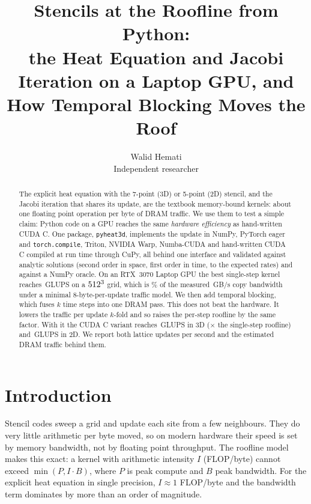 \documentclass[11pt]{article}
\title{Stencils at the Roofline from Python:\\ the Heat Equation and Jacobi Iteration on a
Laptop GPU, and How Temporal Blocking Moves the Roof}
\author{Walid Hemati\\ \small Independent researcher}
\date{}
\newif\ifprovisional
\newcommand{\GLUPS}{\,GLUPS}
\newcommand{\code}[1]{\texttt{#1}}
\begin{document}
\maketitle

\ifprovisional
\begin{center}
\fcolorbox{red!70!black}{red!8}{\parbox{0.92\linewidth}{\centering\bfseries\color{red!60!black}
PROVISIONAL NUMBERS. The performance figures in this version come from
\texttt{results/\benchSource}, measured during development on a GPU shared with other jobs.
They will be replaced by the serial, idle-GPU run of \texttt{bench/run.py --full}.}}
\end{center}
\fi

\begin{abstract}
The explicit heat equation with the 7-point (3D) or 5-point (2D) stencil, and the Jacobi
iteration that shares its update, are the textbook memory-bound kernels: about one floating
point operation per byte of DRAM traffic. We use them to test a simple claim: Python code on a
GPU reaches the same \emph{hardware efficiency} as hand-written CUDA C. One package,
\code{pyheat3d}, implements the update in NumPy, PyTorch eager and \code{torch.compile},
Triton, NVIDIA Warp, Numba-CUDA and hand-written CUDA C compiled at run time through CuPy, all
behind one interface and validated against analytic solutions (second order in space, first
order in time, to the expected rates) and against a NumPy oracle. On an RTX~3070 Laptop GPU the
best single-step kernel reaches \bestSingleThreeDGLUPS\GLUPS{} on a $512^3$ grid, which is
\bestSingleThreeDPctCopy\% of the measured \copyBW\,GB/s copy bandwidth under a minimal
8-byte-per-update traffic model. We then add temporal blocking, which fuses $k$ time steps
into one DRAM pass. This does not beat the hardware. It lowers the traffic per update $k$-fold
and so raises the per-step roofline by the same factor. With it the CUDA C variant reaches
\bestTBThreeDGLUPS\GLUPS{} in 3D (\bestTBThreeDOverRoof$\times$ the single-step roofline) and
\bestTBTwoDGLUPS\GLUPS{} in 2D. We report both lattice updates per second and the estimated DRAM
traffic behind them.
\end{abstract}

\section{Introduction}
Stencil codes sweep a grid and update each site from a few neighbours. They do very little
arithmetic per byte moved, so on modern hardware their speed is set by memory bandwidth, not by
floating point throughput. The roofline model~\cite{williams2009roofline} makes this exact: a
kernel with arithmetic intensity $I$ (FLOP/byte) cannot exceed $\min(P, I\cdot B)$, where $P$
is peak compute and $B$ peak bandwidth. For the explicit heat equation in single precision,
$I\approx 1$ FLOP/byte and the bandwidth term dominates by more than an order of magnitude.
\end{document}
